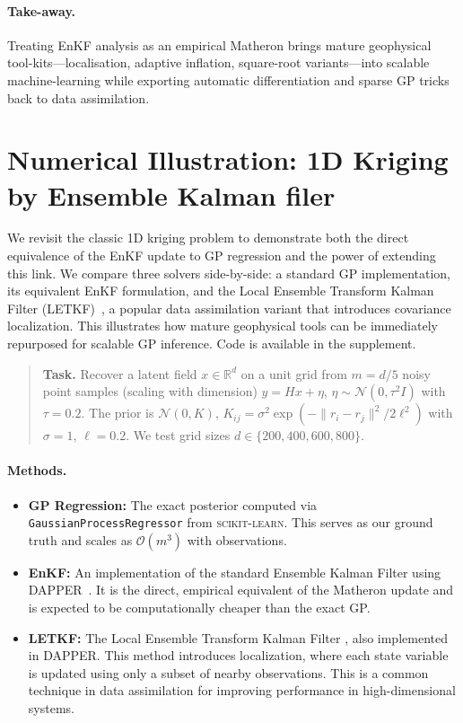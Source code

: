 \documentclass[wcp]{jmlr} %
\begin{document}
\paragraph{Take-away.}
Treating EnKF analysis as an empirical Matheron  brings mature geophysical tool-kits—localisation, adaptive inflation, square-root variants—into scalable machine-learning while exporting automatic differentiation and sparse GP tricks back to data assimilation.

\section{Numerical Illustration:  1D Kriging by Ensemble Kalman filer}
\label{sec:numerical-demo}

We revisit the classic 1D kriging problem to demonstrate both the direct equivalence of the EnKF update to GP regression and the power of extending this link. We compare three solvers side-by-side: a standard GP implementation, its equivalent EnKF formulation, and the Local Ensemble Transform Kalman Filter (LETKF)~\cite{Bocquet2020Online}, a popular data assimilation variant that introduces covariance localization. This illustrates how mature geophysical tools can be immediately repurposed for scalable GP inference. Code is available in the supplement.

\begin{quote}
\textbf{Task.}  Recover a latent field
$x\!\in\!\mathbb R^{d}$ on a unit grid from
$m\!=\!d/5$ noisy point samples (scaling with dimension)
$y = Hx + \eta$, $\eta\!\sim\!\mathcal N(0,\tau^{2}I)$ with
$\tau=0.2$.  The prior is
$\mathcal N(0,K)$, $K_{ij}=\sigma^{2}\!\exp(-\lVert r_i-r_j\rVert^{2}/2\ell^{2})$
with $\sigma=1$, $\ell=0.2$.
We test grid sizes $d\in\{200,400,600,800\}$.
\end{quote}

\paragraph{Methods.}
\begin{itemize}
    \item \textbf{GP Regression:} The exact posterior computed via \texttt{GaussianProcessRegressor} from \textsc{scikit-learn}. This serves as our ground truth and scales as $\mathcal{O}(m^3)$ with observations.
    \item \textbf{EnKF:} An implementation of the standard Ensemble Kalman Filter using DAPPER~\cite{Raanes2024DAPPER}. It is the direct, empirical equivalent of the Matheron update and is expected to be computationally cheaper than the exact GP.
    \item \textbf{LETKF:} The Local Ensemble Transform Kalman Filter \cite{Hunt2007Efficient,Bocquet2020Online}, also implemented in DAPPER. This method introduces localization, where each state variable is updated using only a subset of nearby observations. This is a common technique in data assimilation for improving performance in high-dimensional systems.
\end{itemize}
\end{document}
